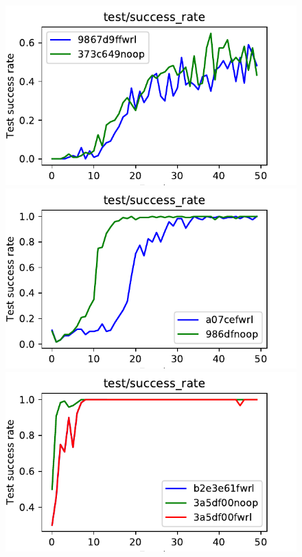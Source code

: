 \begin{figure}
  \def\frac{0.32}
    \includegraphics[width=\frac\columnwidth]{media/res/373c649_FetchSlide-v1-noop/test/success_rate.pdf}%
    \includegraphics[width=\frac\columnwidth]{media/res/a077c9e_FetchPush-v1-fwrl/test/success_rate.pdf}%
    \includegraphics[width=\frac\columnwidth]{media/res/3a5df00_FetchReach-v1-fwrl/test/success_rate.pdf}\\

\end{figure}
